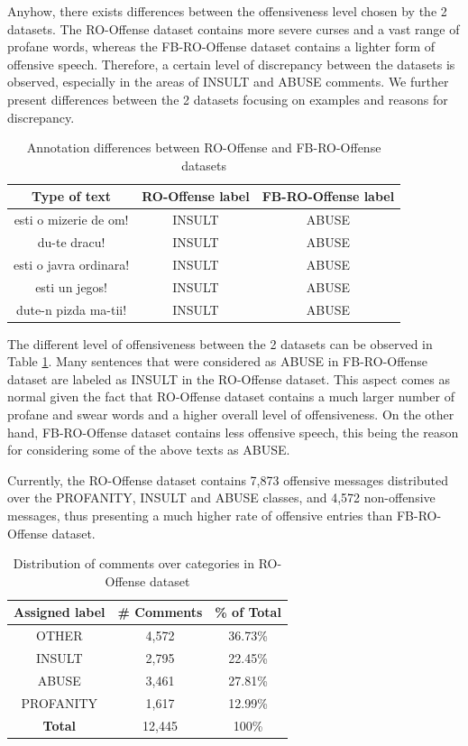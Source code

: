 \documentclass[12pt,a4paper]{report}
\begin{document}
Anyhow, there exists differences between the offensiveness level chosen by the 2 datasets. The RO-Offense dataset contains more severe curses and a vast range of profane words, whereas the FB-RO-Offense dataset contains a lighter form of offensive speech. Therefore, a certain level of discrepancy between the datasets is observed, especially in the areas of INSULT and ABUSE comments. 
We further present differences between the 2 datasets focusing on examples and reasons for discrepancy.

\begin{table}[H]\small\linespread{1}
\centering
\caption{Annotation differences between RO-Offense and FB-RO-Offense datasets}
\label{tab:fb-ro-diff-ro}
\begin{tabular}{ | c | c| c | } 
  \hline
  \textbf{Type of text} & \textbf{RO-Offense label} & \textbf{FB-RO-Offense label}\\\hline
  esti o mizerie de om! & INSULT &  ABUSE \\\hline
  du-te dracu! &  INSULT & ABUSE \\\hline
  esti o javra ordinara! & INSULT & ABUSE \\\hline
  esti un jegos! & INSULT & ABUSE \\\hline
  dute-n pizda ma-tii! & INSULT & ABUSE \\\hline
\end{tabular}
\end{table}

The different level of offensiveness between the 2 datasets can be observed in Table \ref{tab:fb-ro-diff-ro}. Many sentences that were considered as ABUSE in FB-RO-Offense dataset are labeled as INSULT in the RO-Offense dataset. This aspect comes as normal given the fact that RO-Offense dataset contains a much larger number of profane and swear words and a higher overall level of offensiveness. On the other hand, FB-RO-Offense dataset contains less offensive speech, this being the reason for considering some of the above texts as ABUSE.

Currently, the RO-Offense dataset contains 7,873 offensive messages distributed over the PROFANITY, INSULT and ABUSE classes, and 4,572 non-offensive messages, thus presenting a much higher rate of offensive entries than FB-RO-Offense dataset.

\begin{table}[H]\small\linespread{1}
\centering
\caption{Distribution of comments over categories in RO-Offense dataset}
\label{tab:ro-distribution}
\begin{tabular}{ | c | c| c | } 
  \hline
  \textbf{Assigned label} &   \textbf{\# Comments} &   \textbf{\% of Total}\\\hline
  OTHER & 4,572 &   36.73\% \\\hline
  INSULT &   2,795 &   22.45\% \\\hline
  ABUSE &   3,461 &   27.81\% \\\hline
  PROFANITY &  1,617  &  12.99\% \\\hline
  \textbf{Total} &  12,445  &   100\% \\\hline
\end{tabular}
\end{table}
\end{document}
